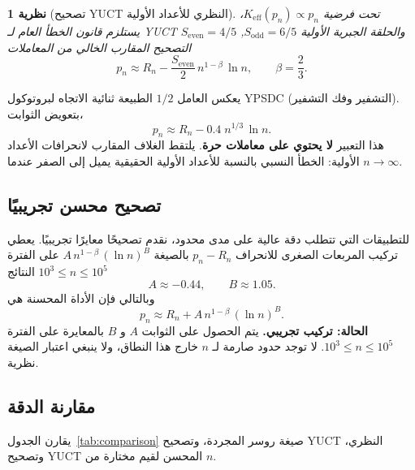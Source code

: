 \documentclass[11pt,a4paper]{article}
\newtheorem{theorem}{نظرية}
\newcommand{\Sodd}{S_{\mathrm{odd}}}
\newcommand{\Seven}{S_{\mathrm{even}}}
\begin{document}
	\begin{theorem}[تصحيح YUCT النظري للأعداد الأولية]\label{thm:yuct-prime-theory}
		تحت فرضية $K_{\mathrm{eff}}(p_n) \propto p_n$، يستلزم قانون الخطأ العام لـ YUCT والحلقة الجبرية الأولية $\Sodd=6/5$, $\Seven=4/5$ التصحيح المقارب الخالي من المعاملات
		\begin{equation}\label{eq:yuct-prime-theory}
			\boxed{ p_n \approx R_n - \frac{\Seven}{2}\, n^{1-\beta}\,\ln n },
			\qquad \beta = \frac{2}{3}.
		\end{equation}
	\end{theorem}
	
	يعكس العامل $1/2$ الطبيعة ثنائية الاتجاه لبروتوكول YPSDC (التشفير وفك التشفير). بتعويض الثوابت،
	\[
	p_n \approx R_n - 0.4\; n^{1/3}\,\ln n .
	\]
	هذا التعبير \textbf{لا يحتوي على معاملات حرة}. يلتقط الغلاف المقارب لانحرافات الأعداد الأولية: الخطأ النسبي بالنسبة للأعداد الأولية الحقيقية يميل إلى الصفر عندما $n\to\infty$.
	
	\subsection{تصحيح محسن تجريبيًا}
	للتطبيقات التي تتطلب دقة عالية على مدى محدود، نقدم تصحيحًا معايرًا تجريبيًا. يعطي تركيب المربعات الصغرى للانحراف $p_n - R_n$ بالصيغة $A\,n^{1-\beta}\,(\ln n)^B$ على الفترة $10^3 \le n \le 10^5$ النتائج
	\[
	A \approx -0.44, \qquad B \approx 1.05.
	\]
	وبالتالي فإن الأداة المحسنة هي
	\begin{equation}\label{eq:yuct-prime-empirical}
		\boxed{ p_n \approx R_n + A\,n^{1-\beta}\,(\ln n)^B }.
	\end{equation}
	\textbf{الحالة: تركيب تجريبي.} يتم الحصول على الثوابت $A$ و $B$ بالمعايرة على الفترة $10^3 \le n \le 10^5$. لا توجد حدود صارمة لـ $n$ خارج هذا النطاق، ولا ينبغي اعتبار الصيغة نظرية.
	
	\subsection{مقارنة الدقة}
	يقارن الجدول~\ref{tab:comparison} صيغة روسر المجردة، وتصحيح YUCT النظري، وتصحيح YUCT المحسن لقيم مختارة من $n$.
	
\end{document}
